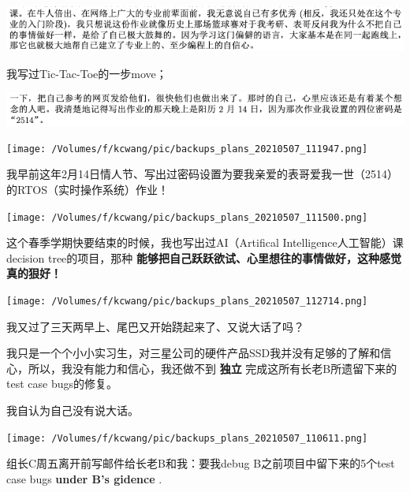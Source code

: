 \documentclass[9pt, b5paper]{article}
\begin{document}
\begin{center}
\includegraphics[width=.9\linewidth]{./pic/backups_plans_20210502_114726.png}
\end{center}

我写过Tic-Tac-Toe的一步move；

\begin{center}
\includegraphics[width=.9\linewidth]{./pic/backups_plans_20210502_120523.png}
\end{center}

\begin{center}
\texttt{[image: /Volumes/f/kcwang/pic/backups\_plans\_20210507\_111947.png]}
\end{center}

我早前这年2月14日情人节、写出过密码设置为要我亲爱的表哥爱我一世（2514）的RTOS（实时操作系统）作业！

\begin{center}
\texttt{[image: /Volumes/f/kcwang/pic/backups\_plans\_20210507\_111500.png]}
\end{center}

这个春季学期快要结束的时候，我也写出过AI（Artifical Intelligence人工智能）课decision tree的项目，那种 \textbf{能够把自己跃跃欲试、心里想往的事情做好，这种感觉真的狠好！}

\begin{center}
\texttt{[image: /Volumes/f/kcwang/pic/backups\_plans\_20210507\_112714.png]}
\end{center}

我又过了三天两早上、尾巴又开始跷起来了、又说大话了吗？

我只是一个个小小实习生，对三星公司的硬件产品SSD我并没有足够的了解和信心，所以，我没有能力和信心，我还做不到 \textbf{独立} 完成这所有长老B所遗留下来的test case bugs的修复。

我自认为自己没有说大话。

\begin{center}
\texttt{[image: /Volumes/f/kcwang/pic/backups\_plans\_20210507\_110611.png]}
\end{center}

组长C周五离开前写邮件给长老B和我：要我debug B之前项目中留下来的5个test case bugs \textbf{under B's gidence} .
\end{document}
